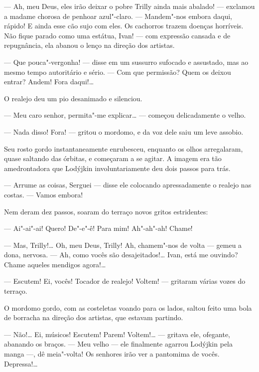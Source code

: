 --- Ah, meu Deus, eles irão deixar o pobre Trilly ainda mais abalado!
--- exclamou a madame chorosa de penhoar azul"-claro. --- Mandem"-nos
embora daqui, rápido! E ainda esse cão sujo com eles. Os cachorros
trazem doenças horríveis. Não fique parado como uma estátua, Ivan! ---
com expressão cansada e de repugnância, ela abanou o lenço na direção
dos artistas.


--- Que pouca"-vergonha! --- disse em um sussurro sufocado e assustado,
mas ao mesmo tempo autoritário e sério. --- Com que permissão? Quem os
deixou entrar? Andem! Fora daqui!\ldots{}

O realejo deu um pio desanimado e silenciou.

--- Meu caro senhor, permita"-me explicar\ldots{} --- começou delicadamente o
velho.

--- Nada disso! Fora! --- gritou o mordomo, e da voz dele saiu um leve
assobio.

Seu rosto gordo instantaneamente enrubesceu, enquanto os olhos
arregalaram, quase saltando das órbitas, e começaram a se agitar. A
imagem era tão amedrontadora que Lodýjkin involuntariamente deu dois
passos para trás.

--- Arrume as coisas, Serguei --- disse ele colocando apressadamente o
realejo nas costas. --- Vamos embora!

Nem deram dez passos, soaram do terraço novos gritos estridentes:

--- Ai"-ai"-ai! Quero! De"-e"-ê! Para mim! Ah"-ah"-ah! Chame!

--- Mas, Trilly!\ldots{} Oh, meu Deus, Trilly! Ah, chamem"-nos de volta ---
gemeu a dona, nervosa. --- Ah, como vocês são desajeitados!\ldots{} Ivan,
está me ouvindo? Chame aqueles mendigos agora!\ldots{}

--- Escutem! Ei, vocês! Tocador de realejo! Voltem! --- gritaram várias
vozes do terraço.

O mordomo gordo, com as costeletas voando para os lados, saltou feito
uma bola de borracha na direção dos artistas, que estavam partindo.

--- Não!\ldots{} Ei, músicos! Escutem! Parem! Voltem!\ldots{} --- gritava ele,
ofegante, abanando os braços. --- Meu velho --- ele finalmente agarrou
Lodýjkin pela manga ---, dê meia"-volta! Os senhores irão ver a pantomima
de vocês. Depressa!\ldots{}

